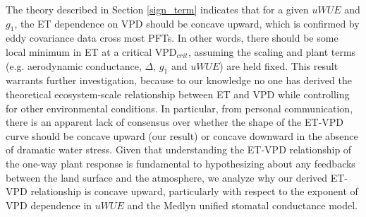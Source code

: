 \documentclass[draft,linenumbers]{agujournal}
\begin{document}
The theory described in Section \ref{sign_term} indicates that for a
given $uWUE$ and $g_1$, the ET dependence on VPD should be concave
upward, which is confirmed by eddy covariance data cross most PFTs. In other words, there should be some local minimum in ET at a
critical VPD$_{crit}$, assuming the scaling and plant terms  (e.g. aerodynamic
conductance, $\Delta$, $g_1$ and $uWUE$) are held fixed. This result warrants further
investigation, because to our knowledge no one has derived the
theoretical ecosystem-scale relationship between ET and VPD while
controlling for other environmental conditions. In particular, from
personal communication, there is an apparent lack of consensus over
whether the shape of the ET-VPD curve should be concave upward (our
result) or concave downward in the absence of dramatic water stress. Given that understanding the ET-VPD
relationship of the one-way plant response is fundamental to
hypothesizing about any feedbacks between the land surface and the
atmosphere, we analyze why our derived ET-VPD relationship is concave
upward, particularly with respect to the exponent of VPD dependence in
$uWUE$ and the Medlyn unified stomatal conductance model.
\end{document}
